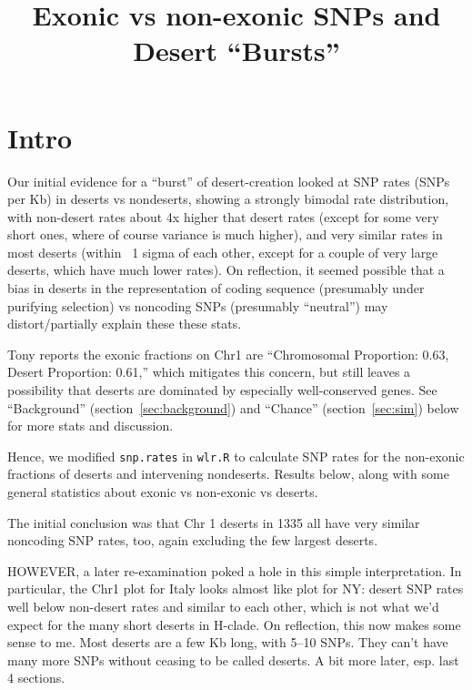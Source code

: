 \documentclass{article}\usepackage[]{graphicx}\usepackage[]{color}
\begin{document}
\title{Exonic vs non-exonic SNPs and Desert ``Bursts''}
\maketitle

\tableofcontents

\section{Intro}
Our initial evidence for a ``burst'' of desert-creation looked at SNP rates (SNPs per Kb) in deserts  
vs nondeserts, showing a strongly bimodal rate distribution, with non-desert rates about 4x higher 
that desert rates (except for some very short ones, where of course variance is much higher), 
and very similar rates in most deserts (within ~1 sigma of each other, except for a couple of 
very large deserts, which have much lower rates).  On reflection, it seemed possible that a 
bias in deserts in the representation of coding sequence (presumably under purifying selection) vs 
noncoding SNPs (presumably ``neutral'') may distort/partially explain these these stats.

Tony reports the exonic fractions on Chr1 are 
  ``Chromosomal Proportion: 0.63, Desert Proportion: 0.61,''
which mitigates this concern, but still leaves a possibility that deserts are dominated by 
especially well-conserved genes.  See ``Background'' (section~\ref{sec:background}) and ``Chance'' 
(section~\ref{sec:sim}) below for more stats and discussion.

Hence, we modified \texttt{snp.rates} in \texttt{wlr.R} to calculate SNP rates for the non-exonic
fractions of deserts and intervening nondeserts.  Results below, along with some general statistics 
about exonic vs non-exonic vs deserts.

The initial conclusion was that Chr 1 deserts in 1335 all have very similar noncoding SNP rates, 
too, again excluding the few largest deserts.

HOWEVER, a later re-examination poked a hole in this simple interpretation.  In particular, the
Chr1 plot for Italy looks almost like plot for NY: desert SNP rates well below non-desert rates 
and similar to each other, which is not what we'd expect for the many short deserts in H-clade.
On reflection, this now makes some sense to me.  Most deserts are a few Kb long, with 5--10 SNPs.  
They can't have many more SNPs without ceasing to be called deserts.  A bit more later, esp. last 4 
sections.
\end{document}
